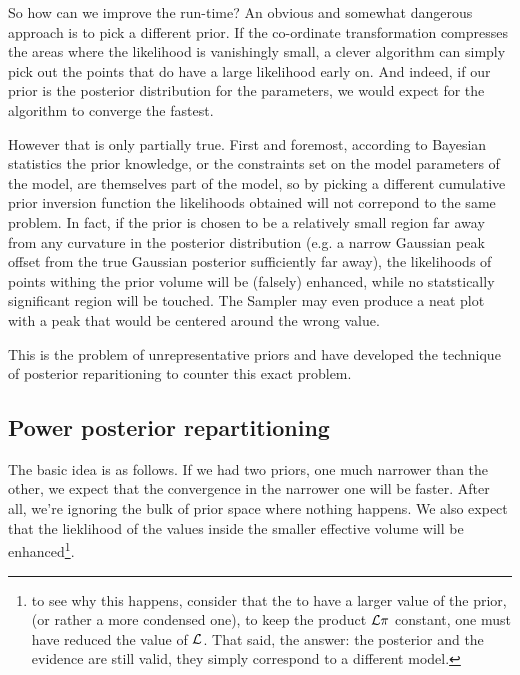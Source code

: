 \documentclass[usenatbib]{mnras}
\begin{document}
So how can we improve the run-time? An obvious and somewhat
dangerous approach is to pick a different prior. If the co-ordinate
transformation compresses the areas where the likelihood is
vanishingly small, a clever algorithm can simply pick out the
points that do have a large likelihood early on. And indeed, if our
prior is the posterior distribution for the parameters, we would
expect for the algorithm to converge the fastest. 

However that is only partially true. First and foremost, according
to Bayesian statistics the prior knowledge, or the constraints set
on the model parameters of the model, are themselves part of the
model, so by picking a different cumulative prior inversion function the
likelihoods obtained will not correpond to the same problem. In
fact, if the prior is chosen to be a relatively small region far
away from any curvature in the posterior distribution (e.g. a
narrow Gaussian peak offset from the true Gaussian posterior
sufficiently far away), the likelihoods of points withing the prior
volume will be (falsely) enhanced, while no statstically
significant region will be touched. The Sampler may even produce a
neat plot with a peak that would be centered around the wrong
value.

This is the problem of unrepresentative priors and
\citeauthor*{chen-ferroz-hobson} have developed the technique of
posterior reparitioning to counter this exact problem.


\subsection{Power posterior repartitioning}
\label{sec:org15d7ceb}

The basic idea is as follows. If we had two priors, one much
narrower than the other, we expect that the convergence in the
narrower one will be faster. After all, we're ignoring the bulk of
prior space where nothing happens. We also expect that the
lieklihood of the values inside the smaller effective volume will
be enhanced\footnote{to see why this happens, consider that the to   have a larger value of the prior, (or rather a more condensed one),   to keep the product \(\cal L \pi\) constant, one must have reduced   the value of \(\cal L\). That said, the answer: the posterior and   the evidence are still valid, they simply correspond to a different  model.}. 
\end{document}
